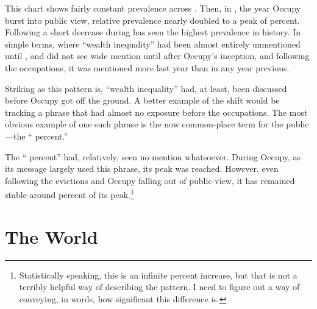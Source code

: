 \documentclass{article}
\begin{document}
This chart shows fairly constant prevalence across .
Then, in , the year Occupy burst into public view, relative prevalence nearly doubled to a peak of  percent.
Following a short decrease during  has seen the highest prevalence in history.
In simple terms, where ``wealth inequality'' had been almost entirely unmentioned until , and did not see wide mention until  after Occupy's inception, and following the occupations, it was mentioned more last year than in any year previous.

Striking as this pattern is, ``wealth inequality'' had, at least, been discussed before Occupy got off the ground.
A better example of the shift would be tracking a phrase that had almost no exposure before the occupations.
The most obvious example of one such phrase is the now common-place term for the public---the `` percent.''


The `` percent'' had, relatively, seen no mention whatsoever.
During Occupy, as its message largely used this phrase, its peak was reached.
However, even following the evictions and Occupy falling out of public view, it has remained stable around  percent of its peak.\footnote{Statistically speaking, this is an infinite percent increase, but that is not a terribly helpful way of describing the pattern. I need to figure out a way of conveying, in words, how significant this difference is.}

\section{The World}

\newpage
\printbibliography
\end{document}
